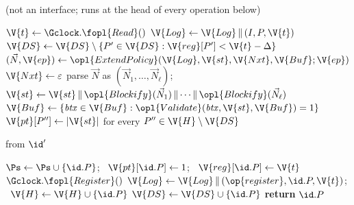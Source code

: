 \begin{interface}
{ \quad (not an interface; runs at the head of every operation below)
\begin{algorithmic}[1]
\algcont
\State $\V{t} \gets \Gclock.\fopl{Read}()$ \label{ln:gledclock}
  \State $\V{Log} \gets \V{Log} \, \| \, (I, P, \V{t})$ \label{ln:gledlog}
\EndIf
\State $\V{DS} \gets \V{DS} \setminus \{P' \in \V{DS} : \V{reg}[P'] < \V{t} - \Delta\}$ \label{ln:glednosync}
 \label{ln:gledhonestonly}
  \State $(\vec{N}, \V{ep}) \gets \opl{ExtendPolicy}(\V{Log}, \V{st}, \V{Nxt}, \V{Buf}; \V{ep})$ \label{ln:gledpolicy}
  \State $\V{Nxt} \gets \varepsilon$
    \State parse $\vec{N}$ as $(\vec{N}_1, \ldots, \vec{N}_\ell)$; \ $\V{st} \gets \V{st} \, \| \, \opl{Blockify}(\vec{N}_1) \, \| \cdots \| \, \opl{Blockify}(\vec{N}_\ell)$ \label{ln:gledextend}
  \EndIf
  \State $\V{Buf} \gets \{\mathit{btx} \in \V{Buf} : \opl{Validate}(\mathit{btx}, \V{st}, \V{Buf}) = 1\}$ \label{ln:gledrevalidate}
   \label{ln:gledwindow}
    \State $\V{pt}[P''] \gets |\V{st}|$ for every $P'' \in \V{H} \setminus \V{DS}$ \label{ln:gledsnapback}
  \EndIf
\EndIf
\algsave
\end{algorithmic}
\vspace{1.4ex}

 \quad from $\id'$
\begin{algorithmic}[1]
\algcont
\State $\Ps \gets \Ps \cup \{\id.P\}$; \ $\V{pt}[\id.P] \gets 1$; \ $\V{reg}[\id.P] \gets \V{t}$
    \State $\Gclock.\fopl{Register}()$ \label{ln:gledclockreg}
  \EndIf
  \State $\V{Log} \gets \V{Log} \, \| \, (\op{register}, \id.P, \V{t})$; \ $\V{H} \gets \V{H} \cup \{\id.P\}$
    \State $\V{DS} \gets \V{DS} \cup \{\id.P\}$ \label{ln:gleddesync}
  \EndIf
\EndIf
\State \textbf{return} $\id.P$
\algsave
\end{algorithmic}
\vspace{1.4ex}

}
\end{interface}
